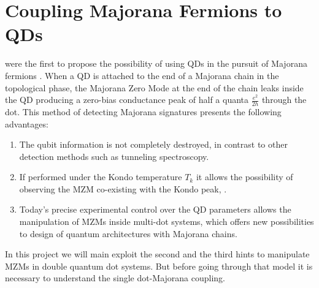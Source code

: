 











\section{Coupling Majorana Fermions to QDs}
\citeauthor{liu_detecting_2011} were the first to propose the possibility of using QDs in the pursuit of Majorana fermions . When a QD is attached to the end of a Majorana chain in the topological phase,  the Majorana Zero Mode at the end of the chain leaks inside the QD \cite{vernek_subtle_2014} producing a zero-bias conductance peak of half a quanta $\frac{e^{2}}{2h}$ through the dot.  This method of detecting Majorana signatures presents the following  advantages:

\begin{enumerate}
  \item The qubit information  is not completely destroyed, in contrast to other detection methods such as tunneling spectroscopy.
  \item If performed under the  Kondo temperature $T_k$ it allows the possibility of observing the  MZM co-existing with the Kondo peak, \cite{lee_kondo_2013,ruiz-tijerina_interaction_2015,gorski_interplay_2018} .

  \item Today's precise experimental control over the QD parameters allows the manipulation of MZMs inside multi-dot systems, which offers new possibilities to design of quantum architectures with Majorana chains.\cite{barkeshli_physical_2015,karzig_scalable_2017} 
\end{enumerate}

In this project we will main exploit the second and the third hints to manipulate MZMs in double quantum dot systems. But before going through that model it is necessary to understand the single dot-Majorana coupling.

